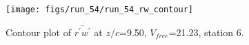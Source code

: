 \begin{figure}[H]
\centering
\texttt{[image: figs/run\_54/run\_54\_rw\_contour]}
\caption{Contour plot of $\overline{r^\prime w^\prime}$ at $z/c$=9.50, $V_{free}$=21.23, station 6.}
\end{figure}


